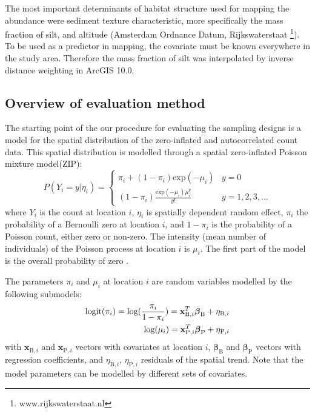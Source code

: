 \documentclass[review]{elsarticle}
\newcommand{\xbf}{\ensuremath{\mathbf x}}
\begin{document}
The most important determinants of habitat structure used for mapping the abundance were sediment texture characteristic, more specifically the mass fraction of silt, and altitude (Amsterdam Ordnance Datum, Rijkswaterstaat \footnote{www.rijkswaterstaat.nl}). To be used as a predictor in mapping, the covariate must be known everywhere in the study area. Therefore the mass fraction of silt was interpolated by inverse distance weighting in ArcGIS 10.0.

\subsection{Overview of evaluation method}
The starting point of the our procedure for evaluating the sampling designs is a model for the spatial distribution of the zero-inflated and autocorrelated count data. This spatial distribution is modelled through a spatial zero-inflated Poisson mixture model(ZIP)\citep{lambert1992, agarwal2002}:
\begin{equation}
    P(Y_i=y | \eta_{i})=
\begin{cases}
\pi_i+(1-\pi_i)\text{exp}(-\mu_i) & y=0 \\
(1-\pi_i)\frac{\text{exp}(-\mu_i)\mu_i^{y}}{y!}& y=1,2,3,\ldots
\end{cases}
\end{equation}
where $Y_i$ is the count at location $i$, $\eta_{i}$ is spatially dependent random effect, $\pi_i$ the probability of a Bernoulli zero at location $i$, and $1-\pi_i$ is the probability of a Poisson count, either zero or non-zero. The intensity (mean number of individuals) of the Poisson process at location $i$ is $\mu_i$. The first part of the model is the overall probability of zero \citep{hilbe2007}.

The parameters $\pi_i$ and $\mu_i$ at location $i$ are random variables modelled by the following submodels:
\begin{eqnarray} \label{eq:glsm}
\text{logit}(\pi_{i})=\text{log}(\frac{\pi_{i}}{1-\pi_{i}})=\xbf_{\mathrm{B},i}^{T}\boldsymbol{\beta}_{\rm{B}} + \eta_{\mathrm{B},i} \nonumber \\
\text{log}(\mu_i)=\xbf_{\mathrm{P},i}^{T}\boldsymbol{\beta}_{\rm{P}} + \eta_{\mathrm{P},i}
\end{eqnarray}
with $\xbf_{\mathrm{B},i}$ and $\xbf_{\mathrm{P},i}$ vectors with covariates at location $i$, $\boldsymbol{\beta}_{\mathrm{B}}$ and $\boldsymbol{\beta}_{\mathrm{P}}$ vectors with regression coefficients, and $\eta_{\mathrm{B},i}$, $\eta_{\mathrm{P},i}$ residuals of the spatial trend. Note that the model parameters can be modelled by different sets of covariates.
\end{document}
